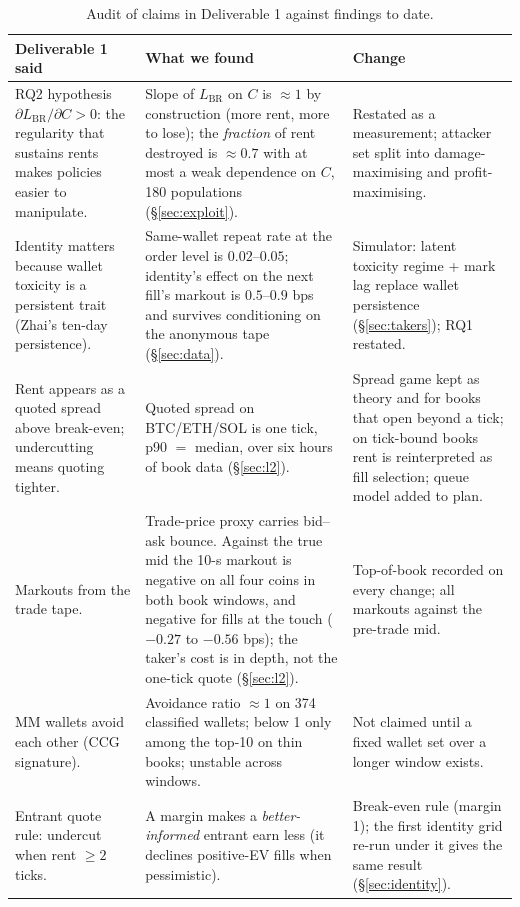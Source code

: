 \documentclass[11pt]{article}
\begin{document}
\begin{table}[h]\small\centering
\begin{tabular}{p{}p{}p{}}
\toprule
\textbf{Deliverable 1 said} & \textbf{What we found} & \textbf{Change} \\
\midrule
RQ2 hypothesis $\partial L_{\mathrm{BR}}/\partial C>0$: the regularity that sustains rents makes policies easier to manipulate. & Slope of $L_{\mathrm{BR}}$ on $C$ is $\approx1$ by construction (more rent, more to lose); the \emph{fraction} of rent destroyed is $\approx0.7$ with at most a weak dependence on $C$, 180 populations (\S\ref{sec:exploit}). & Restated as a measurement; attacker set split into damage-maximising and profit-maximising. \\
\addlinespace
Identity matters because wallet toxicity is a persistent trait (Zhai's ten-day persistence). & Same-wallet repeat rate at the order level is $0.02$--$0.05$; identity's effect on the next fill's markout is $0.5$--$0.9$ bps and survives conditioning on the anonymous tape (\S\ref{sec:data}). & Simulator: latent toxicity regime + mark lag replace wallet persistence (\S\ref{sec:takers}); RQ1 restated. \\
\addlinespace
Rent appears as a quoted spread above break-even; undercutting means quoting tighter. & Quoted spread on BTC/ETH/SOL is one tick, p90 $=$ median, over six hours of book data (\S\ref{sec:l2}). & Spread game kept as theory and for books that open beyond a tick; on tick-bound books rent is reinterpreted as fill selection; queue model added to plan. \\
\addlinespace
Markouts from the trade tape. & Trade-price proxy carries bid--ask bounce. Against the true mid the 10-s markout is negative on all four coins in both book windows, and negative for fills at the touch ($-0.27$ to $-0.56$ bps); the taker's cost is in depth, not the one-tick quote (\S\ref{sec:l2}). & Top-of-book recorded on every change; all markouts against the pre-trade mid. \\
\addlinespace
MM wallets avoid each other (CCG signature). & Avoidance ratio $\approx1$ on 374 classified wallets; below 1 only among the top-10 on thin books; unstable across windows. & Not claimed until a fixed wallet set over a longer window exists. \\
\addlinespace
Entrant quote rule: undercut when rent $\ge 2$ ticks. & A margin makes a \emph{better-informed} entrant earn less (it declines positive-EV fills when pessimistic). & Break-even rule (margin 1); the first identity grid re-run under it gives the same result (\S\ref{sec:identity}). \\
\bottomrule
\end{tabular}
\caption{Audit of claims in Deliverable 1 against findings to date.}\label{tab:changes}
\end{table}
\end{document}
